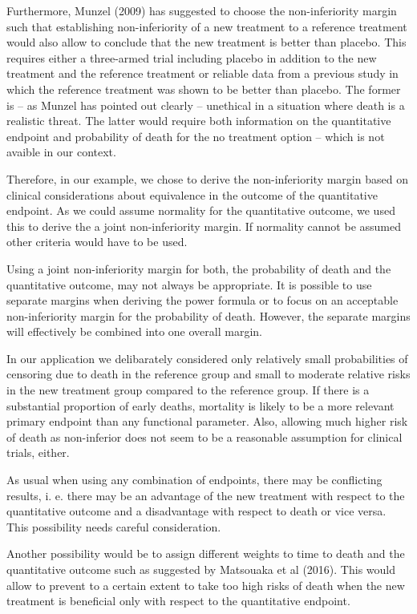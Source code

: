 \documentclass[bimj,fleqn]{w-art}
\theoremstyle{plain}
\theoremstyle{definition}
\begin{document}
Furthermore, Munzel (2009) has suggested to choose the non-inferiority margin
such that establishing non-inferiority of a new treatment to a reference
treatment would also allow to conclude that the new treatment is better than
placebo. This requires either a three-armed trial including placebo in addition
to the new treatment and the reference treatment or reliable data from a previous
study in which the reference treatment was shown to be better than placebo.
The former is -- as Munzel has pointed out clearly -- unethical in a situation where
death is a realistic threat. The latter would require both information on the
quantitative endpoint and probability of death for the no treatment option --
which is not avaible in our context.

Therefore, in our example, we chose to derive the non-inferiority margin based
on clinical considerations about equivalence in the outcome of the quantitative
endpoint. As we could assume normality for the quantitative outcome, we used this to
derive the a joint non-inferiority margin. If normality cannot be assumed
other criteria would have to be used.

Using a joint non-inferiority margin for both, the probability of death and the
quantitative outcome, may not always be appropriate. It is possible to use
separate margins when deriving the power formula or to focus on an acceptable
non-inferiority margin for the probability of death. However, the separate margins
will effectively be combined into one overall margin.

In our application we delibarately considered only relatively small probabilities
of censoring due to death in the reference group and small to moderate relative
risks in the new treatment group compared to the reference group. If there is a
substantial proportion of early deaths, mortality is likely to be a more relevant
primary endpoint than any functional parameter. Also, allowing much higher risk
of death as non-inferior does not seem to be a reasonable assumption for clinical
trials, either.

As usual when using any combination of endpoints, there may be conflicting
results, i. e. there may be an advantage of the new treatment with respect to
the quantitative outcome and a disadvantage with respect to death or vice versa.
This possibility needs careful consideration.

Another possibility would be to assign different weights to time to death and
the quantitative outcome such as suggested by Matsouaka et al (2016). This would
allow to prevent to a certain extent to take too high risks of death when the
new treatment is beneficial only with respect to the quantitative endpoint.
\end{document}
